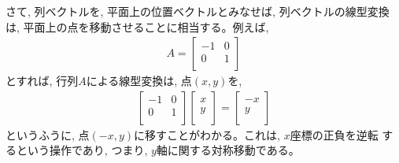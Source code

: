 さて, 列ベクトルを, 平面上の位置ベクトルとみなせば, 列ベクトルの線型変換は, 
平面上の点を移動させることに相当する。例えば, 
\begin{eqnarray}
A=\begin{bmatrix}
-1 & 0 \\
0 & 1 \\
\end{bmatrix}
\end{eqnarray}
とすれば, 行列$A$による線型変換は, 点$(x, y)$を, 
\begin{eqnarray}
\begin{bmatrix}
-1 & 0 \\
0 & 1 \\
\end{bmatrix}
\begin{bmatrix}
x \\
y \\
\end{bmatrix}
=\begin{bmatrix}
-x \\
y \\
\end{bmatrix}
\end{eqnarray}
というふうに, 点$(-x, y)$に移すことがわかる。これは, $x$座標の正負を逆転
するという操作であり, つまり, $y$軸に関する対称移動である。

